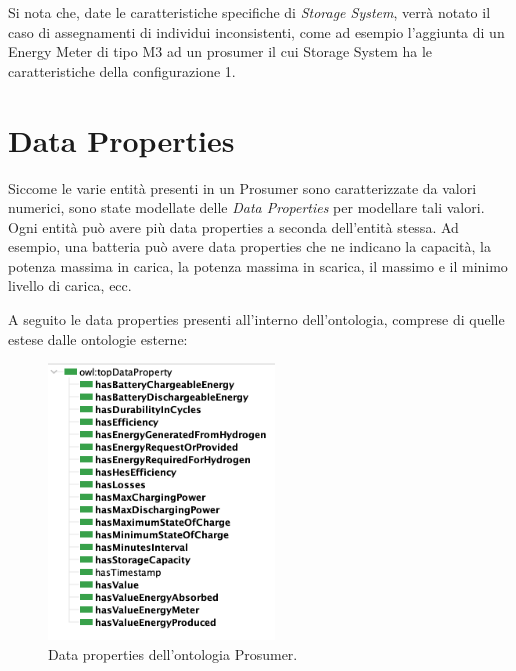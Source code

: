 Si nota che, date le caratteristiche specifiche di \textit{Storage System}, verrà notato il caso di assegnamenti di individui inconsistenti, come ad esempio l'aggiunta di un Energy Meter di tipo M3 ad un prosumer il cui Storage System ha le caratteristiche della configurazione 1.

\section{Data Properties}

Siccome le varie entità presenti in un Prosumer sono caratterizzate da valori numerici, sono state modellate delle \textit{Data Properties} per modellare tali valori.
Ogni entità può avere più data properties a seconda dell'entità stessa.
Ad esempio, una batteria può avere data properties che ne indicano la capacità, la potenza massima in carica, la potenza massima in scarica, il massimo e il minimo livello di carica, ecc.

A seguito le data properties presenti all'interno dell'ontologia, comprese di quelle estese dalle ontologie esterne:

\begin{figure}[H]
    \centering
    \includegraphics[width=6cm]{images/datap_prosumer.png}
    \caption{Data properties dell'ontologia Prosumer.}
    \label{fig:datap_prosumer}
\end{figure}


